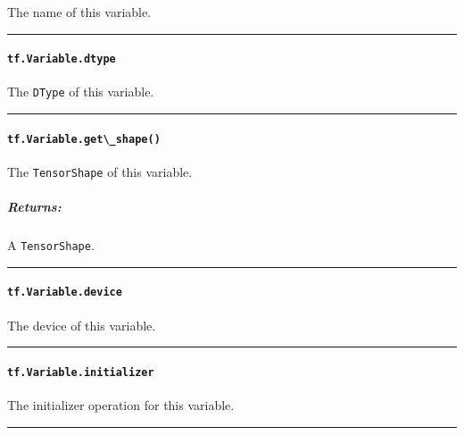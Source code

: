 The name of this variable.

\begin{center}\rule{0.5\linewidth}{\linethickness}\end{center}

\paragraph{\texorpdfstring{\lstinline{tf.Variable.dtype}
}{tf.Variable.dtype }}\label{tf.variable.dtype}

The \lstinline{DType} of this variable.

\begin{center}\rule{0.5\linewidth}{\linethickness}\end{center}

\paragraph{\texorpdfstring{\lstinline{tf.Variable.get\_shape()}
}{tf.Variable.get\_shape() }}\label{tf.variable.getux5fshape}

The \lstinline{TensorShape} of this variable.

\subparagraph{Returns: }\label{returns-8}

A \lstinline{TensorShape}.

\begin{center}\rule{0.5\linewidth}{\linethickness}\end{center}

\paragraph{\texorpdfstring{\lstinline{tf.Variable.device}
}{tf.Variable.device }}\label{tf.variable.device}

The device of this variable.

\begin{center}\rule{0.5\linewidth}{\linethickness}\end{center}

\paragraph{\texorpdfstring{\lstinline{tf.Variable.initializer}
}{tf.Variable.initializer }}\label{tf.variable.initializer}

The initializer operation for this variable.

\begin{center}\rule{0.5\linewidth}{\linethickness}\end{center}

